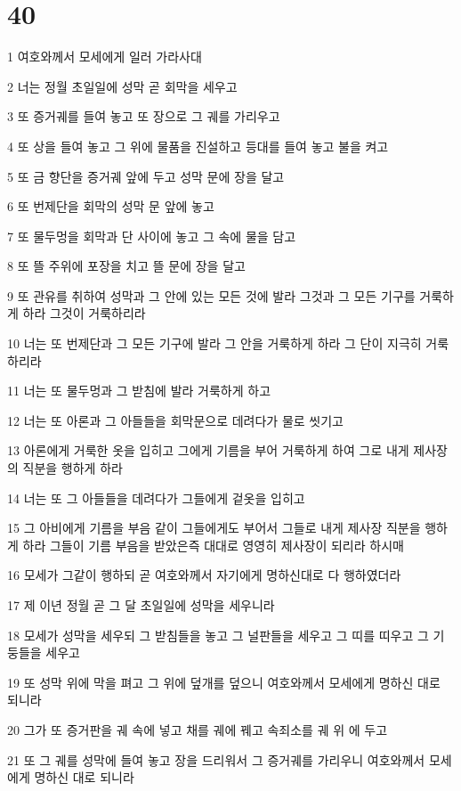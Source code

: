 \chapter{40}

\par 1 여호와께서 모세에게 일러 가라사대
\par 2 너는 정월 초일일에 성막 곧 회막을 세우고
\par 3 또 증거궤를 들여 놓고 또 장으로 그 궤를 가리우고
\par 4 또 상을 들여 놓고 그 위에 물품을 진설하고 등대를 들여 놓고 불을 켜고
\par 5 또 금 향단을 증거궤 앞에 두고 성막 문에 장을 달고
\par 6 또 번제단을 회막의 성막 문 앞에 놓고
\par 7 또 물두멍을 회막과 단 사이에 놓고 그 속에 물을 담고
\par 8 또 뜰 주위에 포장을 치고 뜰 문에 장을 달고
\par 9 또 관유를 취하여 성막과 그 안에 있는 모든 것에 발라 그것과 그 모든 기구를 거룩하게 하라 그것이 거룩하리라
\par 10 너는 또 번제단과 그 모든 기구에 발라 그 안을 거룩하게 하라 그 단이 지극히 거룩하리라
\par 11 너는 또 물두멍과 그 받침에 발라 거룩하게 하고
\par 12 너는 또 아론과 그 아들들을 회막문으로 데려다가 물로 씻기고
\par 13 아론에게 거룩한 옷을 입히고 그에게 기름을 부어 거룩하게 하여 그로 내게 제사장의 직분을 행하게 하라
\par 14 너는 또 그 아들들을 데려다가 그들에게 겉옷을 입히고
\par 15 그 아비에게 기름을 부음 같이 그들에게도 부어서 그들로 내게 제사장 직분을 행하게 하라 그들이 기름 부음을 받았은즉 대대로 영영히 제사장이 되리라 하시매
\par 16 모세가 그같이 행하되 곧 여호와께서 자기에게 명하신대로 다 행하였더라
\par 17 제 이년 정월 곧 그 달 초일일에 성막을 세우니라
\par 18 모세가 성막을 세우되 그 받침들을 놓고 그 널판들을 세우고 그 띠를 띠우고 그 기둥들을 세우고
\par 19 또 성막 위에 막을 펴고 그 위에 덮개를 덮으니 여호와께서 모세에게 명하신 대로 되니라
\par 20 그가 또 증거판을 궤 속에 넣고 채를 궤에 꿰고 속죄소를 궤 위 에 두고
\par 21 또 그 궤를 성막에 들여 놓고 장을 드리워서 그 증거궤를 가리우니 여호와께서 모세에게 명하신 대로 되니라
